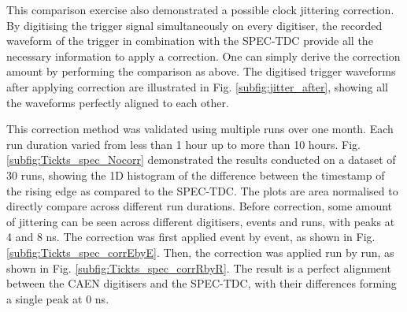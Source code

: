 This comparison exercise also demonstrated a possible clock jittering correction.
By digitising the trigger signal simultaneously on every digitiser, the recorded waveform of the trigger in combination with the SPEC-TDC provide all the necessary information to apply a correction.
One can simply derive the correction amount by performing the comparison as above.
The digitised trigger waveforms after applying correction are illustrated in Fig. \ref{subfig:jitter_after}, showing all the waveforms perfectly aligned to each other.


This correction method was validated using multiple runs over one month.
Each run duration varied from less than 1 hour up to more than 10 hours.
Fig. \ref{subfig:Tickts_spec_Nocorr} demonstrated the results conducted on a dataset of 30 runs, showing the 1D histogram of the difference between the timestamp of the rising edge as compared to the
 SPEC-TDC.
The plots are area normalised to directly compare across different run durations.
Before correction, some amount of jittering can be seen across different digitisers, events and runs, with peaks at 4 and 8 ns.
The correction was first applied event by event, as shown in Fig. \ref{subfig:Tickts_spec_corrEbyE}.
Then, the correction was applied run by run, as shown in Fig. \ref{subfig:Tickts_spec_corrRbyR}.
The result is a perfect alignment between the CAEN digitisers and the SPEC-TDC, with their differences forming a single peak at 0 ns.

